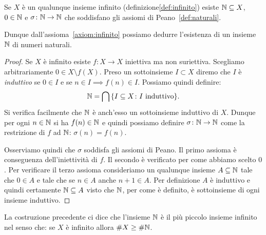 \begin{theorem}
  \label{th:esistenza_naturali}%
Se $X$ è un qualunque insieme infinito (definizione\ref{def:infinito})
esiste ${\mathbb N}\subseteq X$, $0\in {\mathbb N}$ e $\sigma\colon {\mathbb N}\to{\mathbb N}$ 
che soddisfano gli assiomi di Peano~\ref{def:naturali}.

Dunque dall'assioma~\ref{axiom:infinito} possiamo dedurre l'esistenza 
di un insieme ${\mathbb N}$ di numeri naturali.
\end{theorem}
%
\begin{proof}
Se $X$ è infinito esiste $f\colon X\to X$ iniettiva ma non suriettiva. 
Scegliamo arbitrariamente $0\in X\setminus f(X)$. 
Preso un sottoinsieme $I\subset X$ diremo che $I$ è \emph{induttivo}%
%
%
se $0\in I$ e se $n\in I\implies f(n)\in I$. 
Possiamo quindi definire:
\[
  {\mathbb N} = \bigcap {\left\{ I\subseteq X\colon \text{$I$ induttivo} \right\}}.
\]
Si verifica facilmente che ${\mathbb N}$ è anch'esso un sottoinsieme induttivo di $X$.
Dunque per ogni $n\in {\mathbb N}$ si ha $f(n)\in {\mathbb N}$ e quindi possiamo 
definire $\sigma\colon {\mathbb N}\to {\mathbb N}$ come la restrizione di $f$ 
ad ${\mathbb N}$: $\sigma(n)=f(n)$.

Osserviamo quindi che $\sigma$ soddisfa gli assiomi di Peano.
Il primo assioma è conseguenza dell'iniettività di $f$.
Il secondo è verificato per come abbiamo scelto $0$.
Per verificare il terzo assioma consideriamo un qualunque insieme 
$A\subseteq {\mathbb N}$ tale che $0\in A$ e tale che se $n\in A$ anche $n+1\in A$.
Per definizione $A$ è induttivo e quindi certamente 
${\mathbb N}\subseteq A$ visto che ${\mathbb N}$, per come è definito,
è sottoinsieme di ogni insieme induttivo.
\end{proof}

La costruzione precedente ci dice che l'insieme ${\mathbb N}$ è il più piccolo insieme infinito
nel senso che: se $X$ è infinito allora $\# X \ge \# {\mathbb N}$. 




